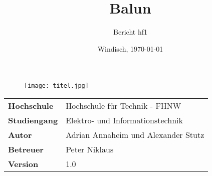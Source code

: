 \documentclass[final]{fhnwreport}       %
\title{Balun}          %
\author{Bericht hf1}          %
\date{Windisch, \today}             %
\begin{document}
\maketitle

\vspace*{-1cm}						    %
\vfill
\begin{figure}[H]
\centering
\texttt{[image: titel.jpg]}
\end{figure}
\vfill

{
\renewcommand\arraystretch{2}
\begin{center}
\begin{tabular}{>{\bf}p{4cm} l}
Hochschule                 &    Hochschule für Technik - FHNW\\
Studiengang                &    Elektro- und Informationstechnik\\
Autor   		           & 	Adrian Annaheim und Alexander Stutz\\
Betreuer                   &    Peter Niklaus\\
Version                    &    1.0 %
\end{tabular}
\end{center}
}

\clearpage
			
%

\tableofcontents
\clearpage









{\sloppypar
\printbibliography[heading=bibintoc]
\label{sec:lit}
}



{%
}
\end{document}
